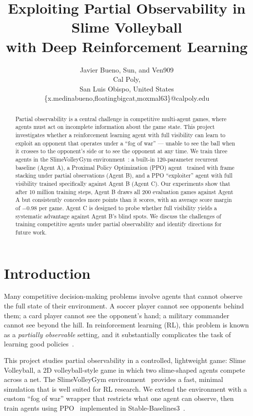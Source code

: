 \documentclass[conference]{IEEEtran}
\title{\LARGE \bf
Exploiting Partial Observability in Slime Volleyball\\
with Deep Reinforcement Learning\\
}
\author{Javier Bueno, Sun, and Ven909\\
Cal Poly,\\
San Luis Obispo, United States\\
\{x.medinabueno,floatingbigcat,moxmal63\}@calpoly.edu
}
\begin{document}
\maketitle
\thispagestyle{empty}
\pagestyle{empty}


\begin{abstract}
Partial observability is a central challenge in competitive multi-agent games, where agents must act on incomplete information about the game state. This project investigates whether a reinforcement learning agent with full visibility can learn to exploit an opponent that operates under a \enquote{fog of war} --- unable to see the ball when it crosses to the opponent's side or to see the opponent at any time. We train three agents in the SlimeVolleyGym environment~\cite{slimevolleygym}: a built-in 120-parameter recurrent baseline (Agent A), a Proximal Policy Optimization (PPO) agent~\cite{schulman2017proximal} trained with frame stacking under partial observations (Agent B), and a PPO \enquote{exploiter} agent with full visibility trained specifically against Agent B (Agent C). Our experiments show that after 10 million training steps, Agent B draws all 200 evaluation games against Agent A but consistently concedes more points than it scores, with an average score margin of $-0.98$ per game. Agent C is designed to probe whether full visibility yields a systematic advantage against Agent B's blind spots. We discuss the challenges of training competitive agents under partial observability and identify directions for future work.
\end{abstract}


\section{Introduction}

Many competitive decision-making problems involve agents that cannot observe the full state of their environment. A soccer player cannot see opponents behind them; a card player cannot see the opponent's hand; a military commander cannot see beyond the hill. In reinforcement learning (RL), this problem is known as a \textit{partially observable} setting, and it substantially complicates the task of learning good policies~\cite{hausknecht2015deep}.

This project studies partial observability in a controlled, lightweight game: Slime Volleyball, a 2D volleyball-style game in which two slime-shaped agents compete across a net. The SlimeVolleyGym environment~\cite{slimevolleygym} provides a fast, minimal simulation that is well suited for RL research. We extend the environment with a custom \enquote{fog of war} wrapper that restricts what one agent can observe, then train agents using PPO~\cite{schulman2017proximal} implemented in Stable-Baselines3~\cite{raffin2021stable}.
\end{document}
